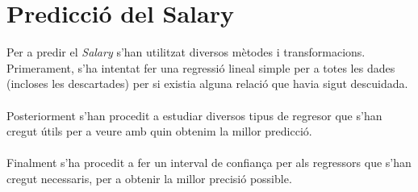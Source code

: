\documentclass[a4paper, 11pt]{article}
\begin{document}
\section{Predicció del Salary}
Per a predir el \textit{Salary} s'han utilitzat diversos mètodes i transformacions. Primerament, s'ha intentat fer una regressió lineal simple per a totes les dades (incloses les descartades) per si existia alguna relació que havia sigut descuidada.\\\\ Posteriorment s'han procedit a estudiar diversos tipus de regresor que s'han cregut útils per a veure amb quin obtenim la millor predicció.\\\\ Finalment s'ha procedit a fer un interval de confiança per als regressors que s'han cregut necessaris, per a obtenir la millor precisió possible.
\newpage
\end{document}
